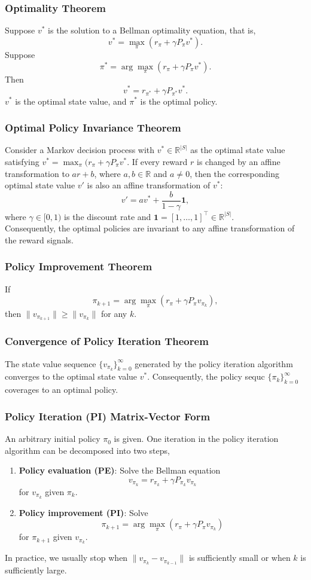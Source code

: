 \documentclass[a4paper,12pt]{report}
\begin{document}
\subsubsection{Optimality Theorem}
Suppose $v^*$ is the solution to a Bellman optimality equation, that is, 
\[v^*=\max_{\pi}\left(r_{\pi}+\gamma P_{\pi}v^*\right).\]
Suppose
\[\pi^*=\arg\max_{\pi}\left(r_{\pi}+\gamma P_{\pi}v^*\right).\]
Then 
\[v^*=r_{\pi^*}+\gamma P_{\pi^*}v^*.\]
$v^*$ is the optimal state value, and $\pi^*$ is the optimal policy.
\subsubsection{Optimal Policy Invariance Theorem}
Consider a Markov decision process with $v^*\in\mathbb{R}^{|S|}$ as the optimal state value satisfying $v^*=\max_{\pi}(r_{\pi}+\gamma P_{\pi}v^*$. If every reward $r$ is changed by an affine transformation to $ar+b$, where $a,b\in\mathbb{R}$ and $a\neq 0$, then the corresponding optimal state value $v'$ is also an affine transformation of $v^*$:
\[v'=av^*+\frac{b}{1-\gamma}\mathbf{1},\]
where $\gamma\in[0,1)$ is the discount rate and $\mathbf{1}=[1,\ldots,1]^{\top}\in\mathbb{R}^{|S|}$.\\
Consequently, the optimal policies are invariant to any affine transformation of the reward signals.
\subsubsection{Policy Improvement Theorem}
If 
\[\pi_{k+1}=\arg\max_{\pi}(r_{\pi}+\gamma P_{\pi}v_{\pi_k}),\]
then $\|v_{\pi_{k+1}}\|\geq\|v_{\pi_k}\|$ for any $k$.
\subsubsection{Convergence of Policy Iteration Theorem}
The state value sequence $\{v_{\pi_k}\}_{k=0}^{\infty}$ generated by the policy iteration algorithm converges to the optimal state value $v^*$. Consequently, the policy sequc $\{\pi_k\}_{k=0}^{\infty}$ coverages to an optimal policy.
\subsubsection{Policy Iteration (PI) Matrix-Vector Form}
An arbitrary initial policy $\pi_0$ is given. One iteration in the policy iteration algorithm can be decomposed into two steps,
\begin{enumerate}
\item \textbf{Policy evaluation (PE)}: Solve the Bellman equation
\[v_{\pi_k}=r_{\pi_k}+\gamma P_{\pi_k}v_{\pi_k}\]
for $v_{\pi_k}$ given $\pi_k$.
\item \textbf{Policy improvement (PI)}: Solve
\[\pi_{k+1}=\arg\max_{\pi}(r_{\pi}+\gamma P_{\pi}v_{\pi_k})\]
for $\pi_{k+1}$ given $v_{\pi_k}$.
\end{enumerate}
In practice, we usually stop when $\|v_{\pi_k}-v_{\pi_{k-1}}\|$ is sufficiently small or when $k$ is sufficiently large.
\end{document}
